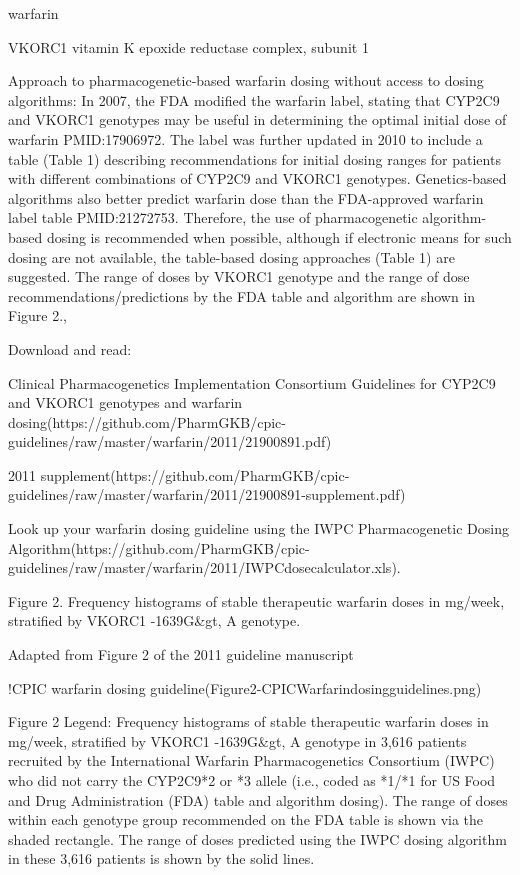 \documentclass{resume} %
\begin{document}
\begin{rSection}{ warfarin }
\begin{rSubsection}{ VKORC1 }{ vitamin K epoxide reductase complex, subunit 1 }{}{}
 \newline
\item Approach to pharmacogenetic-based warfarin dosing without access to dosing algorithms:     In 2007, the FDA modified the warfarin label, stating that CYP2C9 and VKORC1 genotypes may be useful in determining the optimal initial dose of warfarin PMID:17906972. The label was further updated in 2010 to include a table (Table 1) describing recommendations for initial dosing ranges for patients with different combinations of CYP2C9 and VKORC1 genotypes. Genetics-based algorithms also better predict warfarin dose than the FDA-approved warfarin label table PMID:21272753. Therefore, the use of pharmacogenetic algorithm-based dosing is recommended when possible, although if electronic means for such dosing are not available, the table-based dosing approaches (Table 1) are suggested. The range of doses by VKORC1 genotype and the range of dose recommendations/predictions by the FDA table and algorithm are shown in Figure 2., 
 \newline
\item Download and read: 
 \newline
\item Clinical Pharmacogenetics Implementation Consortium Guidelines for CYP2C9 and VKORC1 genotypes and warfarin dosing(https://github.com/PharmGKB/cpic-guidelines/raw/master/warfarin/2011/21900891.pdf)
 \newline
\item 2011 supplement(https://github.com/PharmGKB/cpic-guidelines/raw/master/warfarin/2011/21900891-supplement.pdf)
 \newline
\item Look up your warfarin dosing guideline using the IWPC Pharmacogenetic Dosing Algorithm(https://github.com/PharmGKB/cpic-guidelines/raw/master/warfarin/2011/IWPCdosecalculator.xls).
 \newline
\item Figure 2. Frequency histograms of stable therapeutic warfarin doses in mg/week, stratified by VKORC1 -1639G&gt, A genotype.
 \newline
\item Adapted from Figure 2 of the 2011 guideline manuscript
 \newline
\item !CPIC warfarin dosing guideline(Figure2-CPICWarfarindosingguidelines.png)
 \newline
\item Figure 2 Legend: Frequency histograms of stable therapeutic warfarin doses in mg/week, stratified by VKORC1 -1639G&gt, A genotype in 3,616 patients recruited by the International Warfarin Pharmacogenetics Consortium (IWPC) who did not carry the CYP2C9*2 or *3 allele (i.e., coded as *1/*1 for US Food and Drug Administration (FDA) table and algorithm dosing). The range of doses within each genotype group recommended on the FDA table is shown via the shaded rectangle. The range of doses predicted using the IWPC dosing algorithm in these 3,616 patients is shown by the solid lines.

\end{rSubsection}
\end{rSection}
\end{document}
